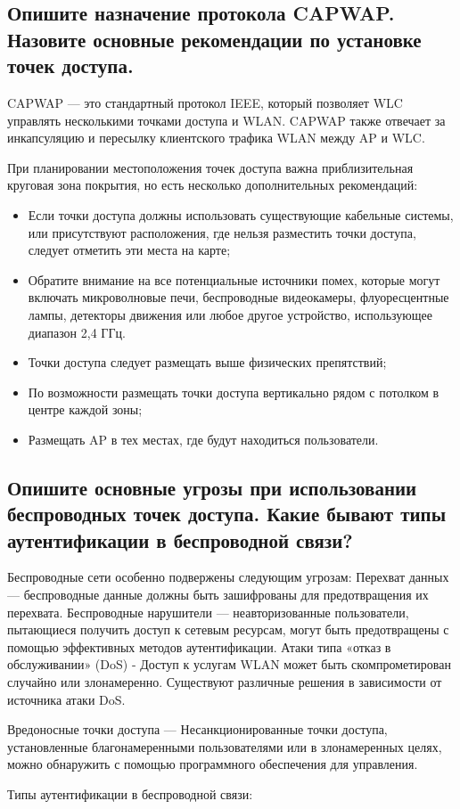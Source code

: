 \subsection{Опишите назначение протокола CAPWAP. Назовите основные 
рекомендации по установке точек доступа.}

CAPWAP --- это стандартный протокол IEEE, который позволяет WLC 
управлять несколькими точками доступа и WLAN. CAPWAP также отвечает 
за инкапсуляцию и пересылку клиентского трафика WLAN между AP и 
WLC.\par
При планировании местоположения точек доступа важна 
приблизительная круговая зона покрытия, но есть несколько 
дополнительных рекомендаций:

\begin{itemize}
	\item Если точки доступа должны использовать существующие кабельные 
		системы, или присутствуют расположения, где нельзя разместить 
		точки доступа, следует отметить эти места на карте;
	\item Обратите внимание на все потенциальные источники помех, которые 
		могут включать микроволновые печи, беспроводные видеокамеры, 
		флуоресцентные лампы, детекторы движения или любое другое 
		устройство, использующее диапазон 2,4 ГГц.
	\item Точки доступа следует размещать выше физических препятствий;
	\item По возможности размещать точки доступа вертикально рядом с 
		потолком в центре каждой зоны;
	\item Размещать AP в тех местах, где будут находиться пользователи.
\end{itemize}

\subsection{Опишите основные угрозы при использовании беспроводных 
точек доступа. Какие бывают типы аутентификации в 
беспроводной связи?}

Беспроводные сети особенно подвержены следующим угрозам:
Перехват данных --- беспроводные данные должны быть 
зашифрованы для предотвращения их перехвата.
Беспроводные нарушители --- неавторизованные пользователи, 
пытающиеся получить доступ к сетевым ресурсам, могут быть 
предотвращены с помощью эффективных методов аутентификации.
Атаки типа «отказ в обслуживании» (DoS) - Доступ к услугам 
WLAN может быть скомпрометирован случайно или злонамеренно. 
Существуют различные решения в зависимости от источника атаки 
DoS.\par
Вредоносные точки доступа --- Несанкционированные точки 
доступа, установленные благонамеренными пользователями или в 
злонамеренных целях, можно обнаружить с помощью программного 
обеспечения для управления.\par
Типы аутентификации в беспроводной связи:

